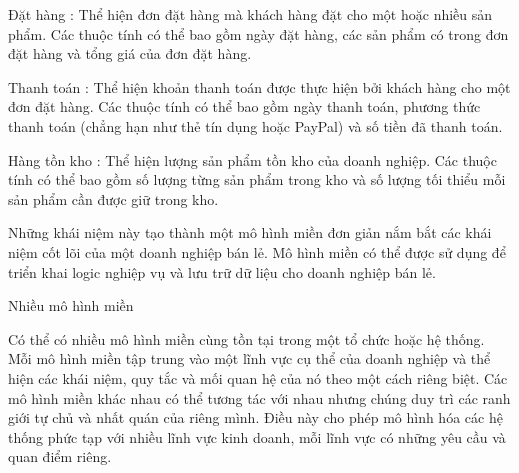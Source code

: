 Đặt hàng : Thể hiện đơn đặt hàng mà khách hàng đặt cho một hoặc nhiều sản phẩm. Các thuộc tính có thể bao gồm ngày đặt hàng, các sản phẩm có trong đơn đặt hàng và tổng giá của đơn đặt hàng.

Thanh toán : Thể hiện khoản thanh toán được thực hiện bởi khách hàng cho một đơn đặt hàng. Các thuộc tính có thể bao gồm ngày thanh toán, phương thức thanh toán (chẳng hạn như thẻ tín dụng hoặc PayPal) và số tiền đã thanh toán.

Hàng tồn kho : Thể hiện lượng sản phẩm tồn kho của doanh nghiệp. Các thuộc tính có thể bao gồm số lượng từng sản phẩm trong kho và số lượng tối thiểu mỗi sản phẩm cần được giữ trong kho.

Những khái niệm này tạo thành một mô hình miền đơn giản nắm bắt các khái niệm cốt lõi của một doanh nghiệp bán lẻ. Mô hình miền có thể được sử dụng để triển khai logic nghiệp vụ và lưu trữ dữ liệu cho doanh nghiệp bán lẻ.

Nhiều mô hình miền

Có thể có nhiều mô hình miền cùng tồn tại trong một tổ chức hoặc hệ thống. Mỗi mô hình miền tập trung vào một lĩnh vực cụ thể của doanh nghiệp và thể hiện các khái niệm, quy tắc và mối quan hệ của nó theo một cách riêng biệt. Các mô hình miền khác nhau có thể tương tác với nhau nhưng chúng duy trì các ranh giới tự chủ và nhất quán của riêng mình. Điều này cho phép mô hình hóa các hệ thống phức tạp với nhiều lĩnh vực kinh doanh, mỗi lĩnh vực có những yêu cầu và quan điểm riêng.









